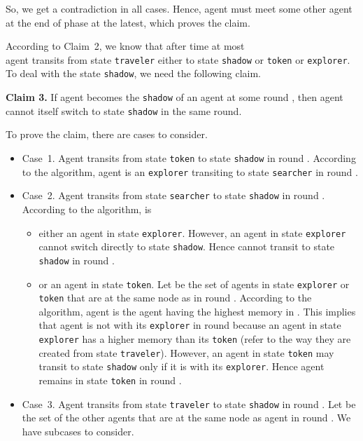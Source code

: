 \documentclass[11pt]{article}
\newcommand{\finclaim}{\hfill }
\newcommand{\qed}{\hfill  \bigbreak}
\newenvironment{proof}{\noindent {\bf Proof.}}{\qed}
\begin{document}
\begin{proof}
{So, we get a contradiction in all cases. Hence, agent  must meet some other agent at the end of phase  at the latest, which proves the claim.} \finclaim

{According to Claim~2, we know that after time at most {\\ } agent  transits from state 
{\tt traveler} either to state {\tt shadow} or {\tt token} or {\tt explorer}.} {To deal with the state {\tt shadow}, we need the following claim.}

\vspace*{0.3cm}
\noindent
{{\bf Claim 3.} If agent  becomes the {\tt shadow} of an agent  at some round , then agent  cannot itself switch to state {\tt shadow} in the same round.}

{To prove the claim, there are  cases to consider.}

\begin{itemize}
\item{ {Case~1.} Agent  transits from state {\tt token} to state {\tt shadow} in round . According to the algorithm, agent  is an 
{\tt explorer} transiting to state {\tt searcher} in round .}

\item{ {Case~2.} Agent  transits from state {\tt searcher} to state {\tt shadow} in round . According to the algorithm,  is }
\begin{itemize}
\item{ either an agent in state {\tt explorer}. However, an agent in state {\tt explorer} cannot switch directly to state {\tt shadow}. Hence  cannot transit to
state {\tt shadow} in round . }
\item{ or an agent in state {\tt token}. Let  be the set of agents in state {\tt explorer} or {\tt token} that are at the same node as  in round . According to the algorithm, agent  is the agent having the highest memory in . This implies that agent  is not with its {\tt explorer} in round  because an agent in state {\tt explorer} has a higher memory than its {\tt token} (refer to the way they are created from state {\tt traveler}). However, an agent in state {\tt token} may transit to state {\tt shadow} only if it is with its {\tt explorer}. Hence agent  remains in state {\tt token} in round .}
\end{itemize}
\item{ {Case~3.} Agent  transits from state {\tt traveler} to state {\tt shadow} in round . Let  be the set of the other agents that are at the same node  as agent  in round . We have  subcases to consider.}
\begin{itemize}


\end{itemize}
\end{itemize}
\end{proof}
\end{document}
